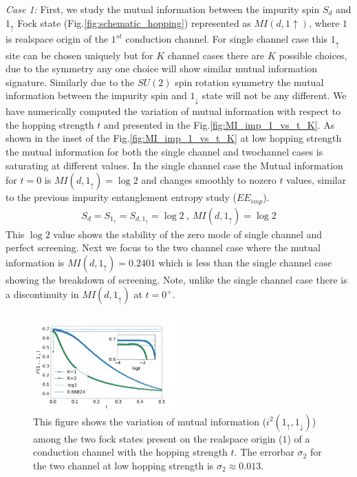 \documentclass[reprint,prb,superscriptaddress]{revtex4-1}
\begin{document}
\par \textit{Case 1:} First, we study the mutual information between the impurity spin $S_d$ and $1_\uparrow$ Fock state (Fig.\ref{fig:schematic_hopping}) represented as $MI(d,1\uparrow)$, where $1$ is realspace origin of the $1^{st}$ conduction channel. For single channel case this $1_{\uparrow}$ site can be chosen uniquely but for $K$ channel cases there are $K$ possible choices, due to the symmetry any one choice will show similar mutual information signature. Similarly due to the $SU(2)$ spin rotation symmetry the mutual information between the impurity spin and $1_{\downarrow}$ state will not be any different. We have numerically computed the variation of mutual information with respect to the hopping strength $t$ and presented in the Fig.\ref{fig:MI_imp_1_vs_t_K}.  As shown in the inset of the Fig.\ref{fig:MI_imp_1_vs_t_K} at low hopping strength the mutual information for both the single channel and twochannel cases is saturating at different values. In the single channel case the Mutual information for $t=0$ is $MI(d,1_{\uparrow})=\log 2$ and changes smoothly to nozero $t$ values, similar to the previous impurity entanglement entropy study ($EE_{imp}$).
\begin{eqnarray}
S_{d}=S_{1_{\uparrow}}=S_{d,1_{\uparrow}}=\log 2~,~MI(d,1_{\uparrow})=\log 2
\end{eqnarray}
This $\log 2$ value shows the stability of the zero mode of single channel and perfect screening. Next we focus to the two channel case where the mutual information is $MI(d,1_{\uparrow})=0.2401$ which is less than the single channel case showing the breakdown of screening. Note, unlike the single channel case there is a discontinuity in $MI(d,1_{\uparrow})$ at $t=0^+$.
\begin{figure}[!htpb]
\includegraphics[width=0.49\textwidth]{plt/A_I2_ch12_['1_up','1_down']}
\caption{This figure shows the variation of mutual information ($i^2(1_{\uparrow},1_{\downarrow})$) among the two fock states present on the realspace origin ($1$) of a conduction channel with the hopping strength $t$. The errorbar $\sigma_2$ for the two channel at low hopping strength is $\sigma_2\approx 0.013$.}
\label{fig:MI_1_2_vs_t_K}
\end{figure}
\end{document}
